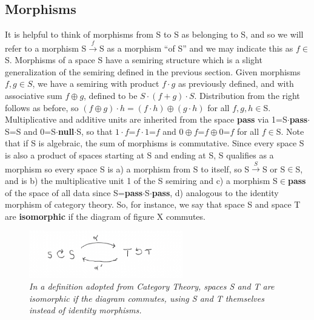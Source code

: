\documentclass[11pt]{article}
\begin{document}
\subsection{Morphisms} 

     It is helpful to think of morphisms from S to S as belonging to S, and so we will refer to a morphism S${\overset f\longrightarrow}$S as a morphism ``of S'' and we may indicate this as $f\in$ S.
Morphisms of a space S have a semiring structure which is a slight generalization of the semiring defined in the previous section.  Given morphisms $f, g\in S$, we have a semiring with 
product $f\cdot g$ as previously defined, and with associative sum $f\oplus g$, defined to be $S\cdot (f+g) \cdot S$.  
Distribution from the right follows as before, so $(f\oplus g)\cdot h = (f\cdot h)\oplus (g\cdot h)$ for all $f,g,h\in$S.  
Multiplicative and additive units are inherited from the space {\bf pass} via 1=S$\cdot${\bf pass}$\cdot$S=S and 0=S$\cdot${\bf null}$\cdot$S, so that 
$1\cdot f$=$f\cdot 1$=$f$ and $0\oplus f$=$f\oplus 0$=$f$ for all $f\in$S. Note that if S is algebraic, the sum of morphisms is commutative.  
Since every space S is also a product of spaces starting at S and ending at S, S qualifies as a morphism so every space S is a) a morphism 
from S to itself, so S${\overset S\rightarrow}$S or S$\in$S, and is b) the multiplicative unit 1 of the S semiring and c) a morphism S$\in${\bf pass} of the space of all data 
since S={\bf pass}$\cdot$S$\cdot${\bf pass}, d) analogous to the identity morphism of category theory.  So, for instance, we say that space S and space T are {\bf isomorphic} 
if the diagram of figure X commutes.   

\begin{figure}[h]
\centering
\includegraphics[width=0.6\textwidth]{isomorphism.pdf}
\caption{{\it In a definition adopted from Category Theory, spaces S and T are isomorphic if the diagram commutes, using S and T themselves instead of identity morphisms.}}
\end{figure}
\end{document}
